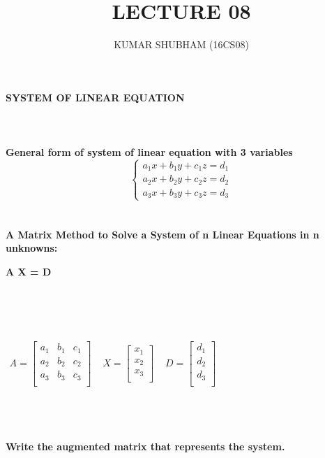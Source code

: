 \documentclass[15pt]{article}
\begin{document}
\title{LECTURE 08}
\author{KUMAR SHUBHAM (16CS08)}

\maketitle
\textbf{SYSTEM OF LINEAR EQUATION}\\
\\
\\
\\
\textbf{General form of system of linear equation with 3 variables}\\

\[
\left\{ 
\begin{array}{c}
a_1x+b_1y+c_1z=d_1 \\ 
a_2x+b_2y+c_2z=d_2 \\ 
a_3x+b_3y+c_3z=d_3
\end{array}
\right. 
\]
\\ 
\\
\textbf{A Matrix Method to Solve a System of n Linear Equations in n unknowns:}\\
\centerline{
\textbf{A \space X \space = \space D}}
\\
\\
\\
\centerline{
$\begin{matrix}
A=
\begin{bmatrix}
a_1 & b_1 & c_1\\
a_2 & b_2 & c_2\\
a_3 & b_3 & c_3\\
\end{bmatrix}
\end{matrix}$
$\begin{matrix}
 X=
\begin{bmatrix}
x_1\\
x_2\\
x_3\\
\end{bmatrix}
\end{matrix}$
$\begin{matrix}
D=
\begin{bmatrix}
d_1\\
d_2\\
d_3\\
\end{bmatrix}
\end{matrix}$
}\\
\\
\\
\textbf{Write the augmented matrix that represents the system.}\\
\end{document}
